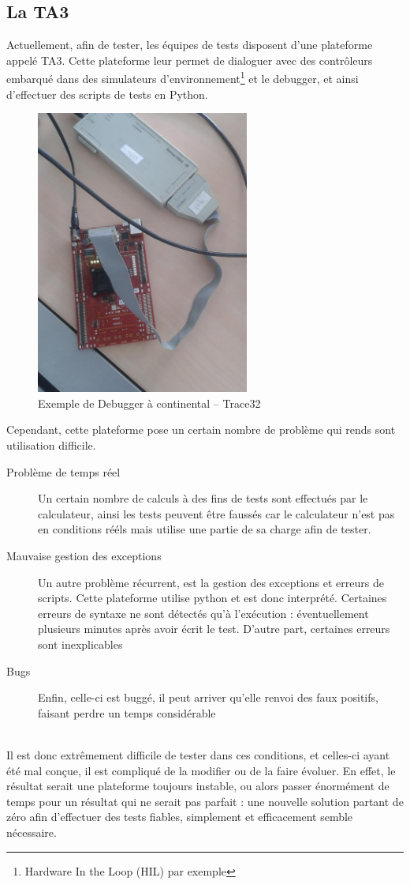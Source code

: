 	\subsection{La TA3}
	Actuellement, afin de tester, les équipes de tests disposent d'une plateforme appelé TA3. Cette plateforme leur permet de dialoguer avec des contrôleurs embarqué dans des simulateurs d'environnement\footnote{Hardware In the Loop (HIL) par exemple} et le debugger, et ainsi d'effectuer des scripts de tests en Python.
	\begin{figure}[H]		
		\centering
		\includegraphics[width=7cm]{contents/images/t32.jpg}
		\caption{Exemple de Debugger à continental -- Trace32}
		\label{fig:photoHil}
	\end{figure}

	Cependant, cette plateforme pose un certain nombre de problème qui rends sont utilisation difficile.
	\begin{description}
		\item[Problème de temps réel] Un certain nombre de calculs à des fins de tests sont effectués par le calculateur, ainsi les tests peuvent être faussés car le calculateur n'est pas en conditions rééls mais utilise une partie de sa charge afin de tester.
		\item[Mauvaise gestion des exceptions] Un autre problème récurrent, est la gestion des exceptions et erreurs de scripts. Cette plateforme utilise python et est donc interprété. Certaines erreurs de syntaxe ne sont détectés qu'à l'exécution : éventuellement plusieurs minutes après avoir écrit le test. D'autre part, certaines erreurs sont inexplicables
		\item[Bugs] Enfin, celle-ci est buggé, il peut arriver qu'elle renvoi des faux positifs, faisant perdre un temps considérable
	\end{description}
~\\
	Il est donc extrêmement difficile de tester dans ces conditions, et celles-ci ayant été mal conçue, il est compliqué de la modifier ou de la faire évoluer. En effet, le résultat serait une plateforme toujours instable, ou alors passer énormément de temps pour un résultat qui ne serait pas parfait : une nouvelle solution partant de zéro afin d'effectuer des tests fiables, simplement et efficacement semble nécessaire.

